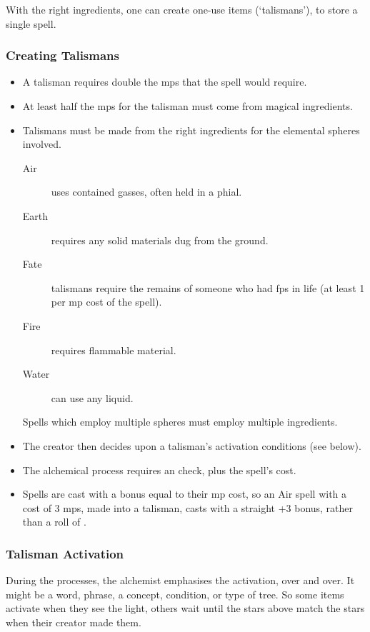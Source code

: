 \begin{multicols}{2}

\noindent
With the right ingredients, one
can create one-use items (`talismans'), to store a single spell.

\subsubsection{Creating Talismans}

\begin{itemize}
  \item
  A talisman requires double the \glspl{mp} that the spell would require.
  \item
  At least half the \glspl{mp} for the talisman must come from magical ingredients.
  \item
  Talismans must be made from the right ingredients for the elemental spheres involved.
  \begin{description}
    \item[Air]
    uses contained gasses, often held in a phial.
    \item[Earth]
    requires any solid materials dug from the ground.
    \item[Fate]
    talismans require the remains of someone who had \glspl{fp} in life (at least 1 per \gls{mp} cost of the spell).
    \item[Fire]
    requires flammable material.
    \item[Water]
    can use any liquid.
  \end{description}
  Spells which employ multiple spheres must employ multiple ingredients.
  \item
  The creator then decides upon a talisman's activation conditions (see below).
  \item
  The alchemical process requires an  check, \tn[7] plus the spell's cost.
  \item
  Spells are cast with a bonus equal to their \gls{mp} cost, so an Air spell with a cost of 3 \glspl{mp}, made into a talisman, casts with a straight +3 bonus, rather than a roll of .
\end{itemize}

\subsubsection{Talisman Activation}

During the processes, the alchemist emphasises the activation, over and over.
It might be a word, phrase, a concept, condition, or type of tree.
So some items activate when they see the light, others wait until the stars above match the stars when their creator made them.


\end{multicols}
